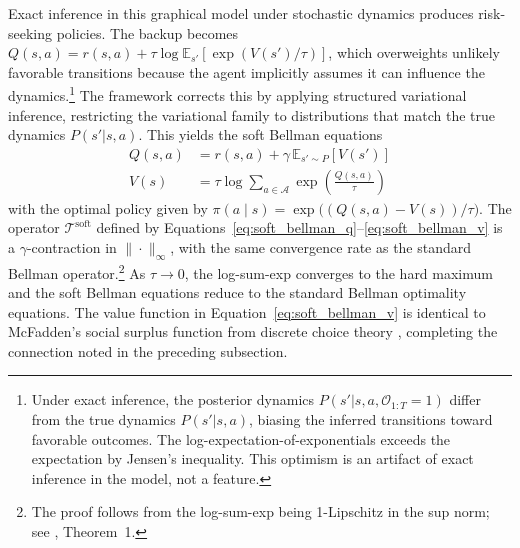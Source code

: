 Exact inference in this graphical model under stochastic dynamics produces risk-seeking policies. The backup becomes $Q(s,a) = r(s,a) + \tau \log \mathbb{E}_{s'}[\exp(V(s')/\tau)]$, which overweights unlikely favorable transitions because the agent implicitly assumes it can influence the dynamics.\footnote{Under exact inference, the posterior dynamics $P(s'|s,a,\mathcal{O}_{1:T}=1)$ differ from the true dynamics $P(s'|s,a)$, biasing the inferred transitions toward favorable outcomes. The log-expectation-of-exponentials exceeds the expectation by Jensen's inequality. This optimism is an artifact of exact inference in the model, not a feature.} The framework corrects this by applying structured variational inference, restricting the variational family to distributions that match the true dynamics $P(s'|s,a)$. This yields the soft Bellman equations
\begin{align}
Q(s,a) &= r(s,a) + \gamma \, \mathbb{E}_{s' \sim P}[V(s')] \label{eq:soft_bellman_q} \\
V(s) &= \tau \log \sum_{a \in \mathcal{A}} \exp\!\left(\frac{Q(s,a)}{\tau}\right) \label{eq:soft_bellman_v}
\end{align}
with the optimal policy given by $\pi(a \mid s) = \exp\bigl((Q(s,a) - V(s))/\tau\bigr)$. The operator $\mathcal{T}^{\mathrm{soft}}$ defined by Equations~\eqref{eq:soft_bellman_q}--\eqref{eq:soft_bellman_v} is a $\gamma$-contraction in $\|\cdot\|_\infty$, with the same convergence rate as the standard Bellman operator.\footnote{The proof follows from the log-sum-exp being 1-Lipschitz in the sup norm; see \citet{Haarnoja2017}, Theorem~1.} As $\tau \to 0$, the log-sum-exp converges to the hard maximum and the soft Bellman equations reduce to the standard Bellman optimality equations. The value function in Equation~\eqref{eq:soft_bellman_v} is identical to McFadden's social surplus function from discrete choice theory \citep{McFadden1978}, completing the connection noted in the preceding subsection.

